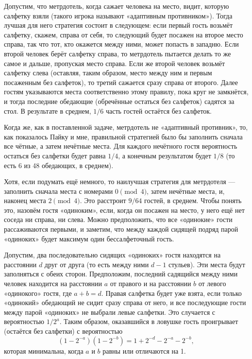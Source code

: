 Допустим, что метрдотель, когда сажает человека на место, видит, которую салфетку взяли (такого игрока называют «адаптивным противником»). %
Тогда лучшая для него стратегия состоит в следующем:
если первый гость возьмёт салфетку, скажем, справа от себя, то следующий будет посажен на второе место справа, так что тот, кто окажется между ними, может попасть в западню.
Если второй человек берёт салфетку справа, то метрдотель пытается делать то же самое и дальше, пропуская место справа.
Если же второй человек возьмёт салфетку слева (оставляя, таким образом, место между ним и первым посаженным без салфеток), то третий сажается сразу справа от второго.
Далее гостям указываются места соответственно этому правилу, пока круг не замкнётся, и тогда последние обедающие (обречённые остаться без салфеток) садятся за стол.
В результате в среднем, $1/6$ часть гостей остаётся без салфеток.

Когда же, как в поставленной задаче, метрдотель не «адаптивный противник», то, как показалось Пайку и мне, правильной стратегией было бы заполнить сначала все чётные, а затем нечётные места.
Для каждого нечётного гостя вероятность остаться без салфетки будет равна $1/4$, %
а конечным результатом будет $1/8$ (то есть 6 из 48 обедающих, в среднем).

Хотя, если подумать ещё немного, то наилучшая стратегия для метрдотеля --- заполнить сначала места с номерами $0\pmod4$, затем нечётные места, и, наконец места $2\pmod4$.
Это расстроит $9/64$ гостей, в среднем.
Чтобы понять это, назовём гостя «одиноким», если, когда он посажен на место, у него ещё нет соседа ни справа, ни слева.
Можно предположить, что все «одинокие» гости рассаживаются первыми, и заметим, что между каждой сидящей подряд парой «одиноких» будет максимум один бессалфеточный гость.

Допустим, два последовательно сидящих «одиноких» гостя находятся на расстоянии $d$ друг от друга (то есть между ними $d-1$ стульев).
Эти места будут заполняться с обеих сторон.
Предположим, последний садящийся между ними человек находится на расстоянии $a$ от правого и на расстоянии $b$ от левого «одинокого» гостя, где $a+b=d$.
Правая салфетка будет уже взята, если только «одинокий» обедающий не сидит сразу справа от него, и все последующие гости между парой «одиноких» не выбрали левые салфетки.
Это случается с вероятностью $1/2^a$.
Таким образом, оказавшийся в ловушке 
гость проигрывает (остаётся без салфетки) с вероятностью
\[(1-2^{-a})(1-2^{-b})=1 + 2^{-d}-2^{-a}-2^{-b},\]
которая минимальна, когда $a$ и $b$ равны или отличаются на 1.

